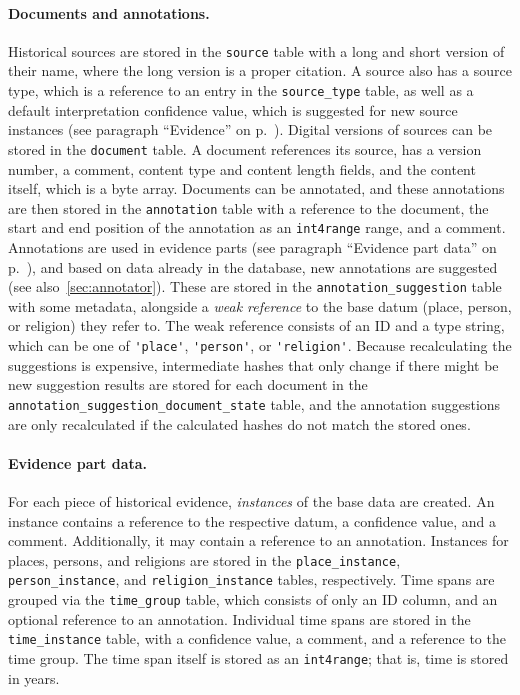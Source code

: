 \paragraph{Documents and annotations.}
Historical sources are stored in the \verb!source! table with a long and short version of their name, where the long version is a proper citation.
A source also has a source type, which is a reference to an entry in the \verb!source_type! table, as well as a default interpretation confidence value, which is suggested for new source instances (see paragraph \enquote{Evidence} on p.~\pageref{par:evidence}).
Digital versions of sources can be stored in the \verb!document! table.
A document references its source, has a version number, a comment, content type and content length fields, and the content itself, which is a byte array.
Documents can be annotated, and these annotations are then stored in the \verb!annotation! table with a reference to the document, the start and end position of the annotation as an \verb!int4range! range, and a comment.
Annotations are used in evidence parts (see paragraph \enquote{Evidence part data} on p.~\pageref{par:evidence-part-data}), and based on data already in the database, new annotations are suggested (see also~\cref{sec:annotator}).
These are stored in the \verb!annotation_suggestion! table with some metadata, alongside a \emph{weak reference} to the base datum (place, person, or religion) they refer to.
The weak reference consists of an ID and a type string, which can be one of \verb!'place'!, \verb!'person'!, or \verb!'religion'!.
Because recalculating the suggestions is expensive, intermediate hashes that only change if there might be new suggestion results are stored for each document in the \verb!annotation_suggestion_document_state! table, and the annotation suggestions are only recalculated if the calculated hashes do not match the stored ones.


\paragraph{Evidence part data.}\label{par:evidence-part-data}
For each piece of historical evidence, \emph{instances} of the base data are created.
An instance contains a reference to the respective datum, a confidence value, and a comment.
Additionally, it may contain a reference to an annotation.
Instances for places, persons, and religions are stored in the \verb!place_instance!, \verb!person_instance!, and \verb!religion_instance! tables, respectively.
Time spans are grouped via the \verb!time_group! table, which consists of only an ID column, and an optional reference to an annotation.
Individual time spans are stored in the \verb!time_instance! table, with a confidence value, a comment, and a reference to the time group.
The time span itself is stored as an \verb!int4range!; that is, time is stored in years.


